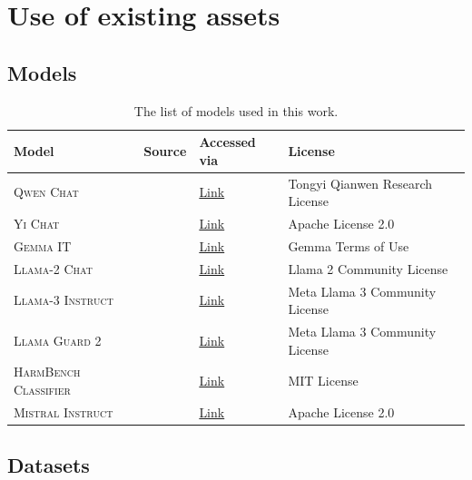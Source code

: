 \documentclass{article}
\begin{document}
\clearpage
\section{Use of existing assets}
\label{apdx:assets}

\subsection{Models}
\label{apdx:assets:models}
\begin{table}[h!]
\small
\centering
\caption{The list of models used in this work.}
\label{tab:model_assets}
\begin{tabularx}{\textwidth}{l l l l}
\toprule
Model & Source & Accessed via & License \\
\midrule
\textsc{Qwen Chat} & \citet{bai2023qwen} & \href{https://huggingface.co/Qwen/Qwen-1_8B-Chat}{Link} & Tongyi Qianwen Research License\\
\textsc{Yi Chat} & \citet{young2024yi} & \href{https://huggingface.co/01-ai/Yi-6B-Chat}{Link} & Apache License 2.0 \\
\textsc{Gemma IT}  &  \citet{team2024gemma} & \href{https://huggingface.co/google/gemma-2b-it}{Link} & Gemma Terms of Use \\
\textsc{Llama-2 Chat} &  \citet{touvron2023llama} & \href{https://huggingface.co/meta-llama/Llama-2-7b-chat-hf}{Link} & Llama 2 Community License \\
\textsc{Llama-3 Instruct} &  \citet{llama3modelcard} & \href{https://huggingface.co/meta-llama/Meta-Llama-3-8B-Instruct}{Link} & Meta Llama 3 Community License \\
\textsc{Llama Guard 2} &  \citet{metallamaguard2} & \href{https://huggingface.co/meta-llama/Meta-Llama-Guard-2-8B}{Link} & Meta Llama 3 Community License \\
\textsc{HarmBench Classifier} &  \citet{mazeika2024harmbench} & \href{https://huggingface.co/cais/HarmBench-Llama-2-13b-cls}{Link} & MIT License \\
\textsc{Mistral Instruct} & \citet{jiang2023mistral} & \href{https://huggingface.co/mistralai/Mistral-7B-Instruct-v0.1}{Link} & Apache License 2.0 \\
\bottomrule
\end{tabularx}
\end{table}

\subsection{Datasets}
\label{apdx:assets:datasets}
\end{document}
